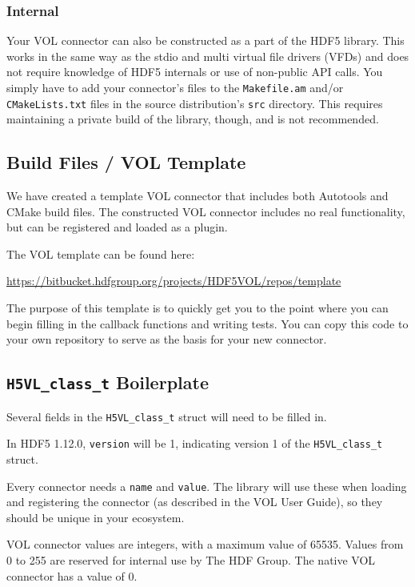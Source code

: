 \subsubsection*{Internal}

Your VOL connector can also be constructed as a part of the HDF5 library. This
works in the same way as the stdio and multi virtual file drivers (VFDs) and
does not require knowledge of HDF5 internals or use of non-public API calls. You
simply have to add your connector's files to the {\tt Makefile.am} and/or
{\tt CMakeLists.txt} files in the source distribution's {\tt src} directory.
This requires maintaining a private build of the library, though, and is not
recommended.

\subsection{Build Files / VOL Template}

We have created a template VOL connector that includes both Autotools and CMake
build files. The constructed VOL connector includes no real functionality, but 
can be registered and loaded as a plugin.

The VOL template  can be found here:

\quad \quad \url{https://bitbucket.hdfgroup.org/projects/HDF5VOL/repos/template}

The purpose of this template is to quickly get you to the point where you can
begin filling in the callback functions and writing tests. You can copy this
code to your own repository to serve as the basis for your new connector.


\subsection{{\tt H5VL\_class\_t} Boilerplate}

Several fields in the {\tt H5VL\_class\_t} struct will need to be filled in.

In HDF5 1.12.0, {\tt version} will be 1, indicating version 1 of the {\tt H5VL\_class\_t} struct.

Every connector needs a {\tt name} and {\tt value}. The library will use these when
loading and registering the connector (as described in the VOL User Guide), so
they should be unique in your ecosystem.

VOL connector values are integers, with a maximum value of 65535. Values from
0 to 255 are reserved for internal use by The HDF Group. The native VOL connector
has a value of 0.

